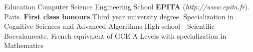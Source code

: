 







\begin{rubric}{Education}
  \entry*[1999/2004]
  Computer Science Engineering School \textbf{EPITA}
  (\textit{http://www.epita.fr}). Paris. \textbf{First class honours}
  \entry*
  Third year university degree. Specialization in Cognitive Sciences and
  Advanced Algorithms
  \entry*[1999]
  High school - Scientific Baccalaureate. French equivalent of GCE A
  Levels with specialization in Mathematics
\end{rubric}
